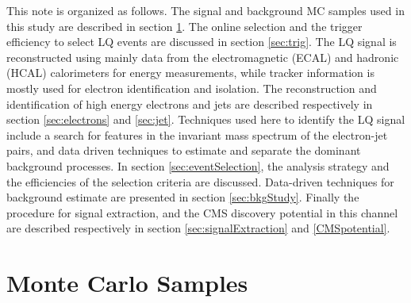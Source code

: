 This note is organized as follows. 
The signal and background MC samples used in this study are described in section \ref{sec:MCSamples}.
The online selection and the trigger efficiency to select LQ events are discussed in section \ref{sec:trig}.
The LQ signal is reconstructed using mainly data from the
electromagnetic (ECAL) and hadronic (HCAL) calorimeters for energy measurements, while tracker information 
is mostly used for electron identification and isolation. 
The reconstruction and identification of high energy electrons and jets are described respectively 
in section \ref{sec:electrons} and \ref{sec:jet}.
Techniques used here to identify the LQ signal include a search for features in the invariant mass
spectrum of the electron-jet pairs, and data driven techniques to estimate 
and separate the dominant background processes.
In section \ref{sec:eventSelection}, the analysis strategy and the efficiencies of the selection criteria 
are discussed. Data-driven techniques for background estimate are presented in section \ref{sec:bkgStudy}.
Finally the procedure for signal extraction, and the CMS discovery potential in this channel are described
respectively in section \ref{sec:signalExtraction} and \ref{CMSpotential}.



\section{Monte Carlo Samples} \label{sec:MCSamples}


